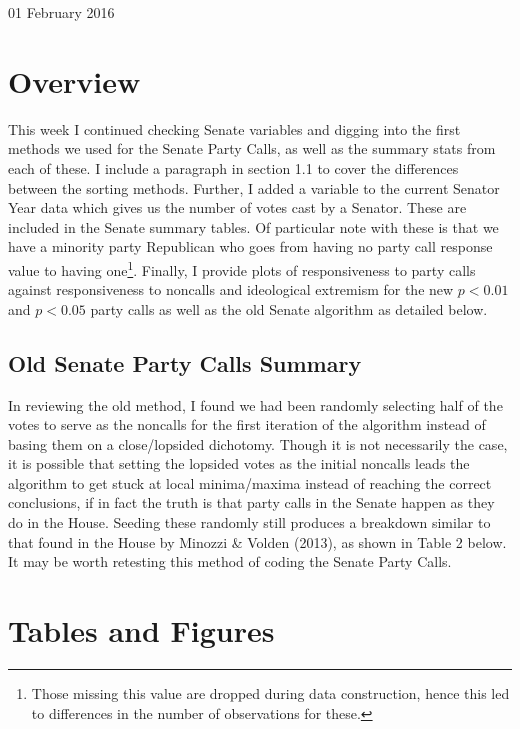 \documentclass[12pt]{article}
\begin{document}
\begin{center}
\Large 01 February 2016
\end{center}

\section{Overview}

This week I continued checking Senate variables and digging into the first methods we used for the Senate Party Calls, as well as the summary stats from each of these. I include a paragraph in section 1.1 to cover the differences between the sorting methods. Further, I added a variable to the current Senator Year data which gives us the number of votes cast by a Senator. These are included in the Senate summary tables. Of particular note with these is that we have a minority party Republican who goes from having no party call response value to having one\footnote{Those missing this value are dropped during data construction, hence this led to differences in the number of observations for these.}. Finally, I provide plots of responsiveness to party calls against responsiveness to noncalls and ideological extremism for the new $ p < 0.01 $ and $ p < 0.05 $ party calls as well as the old Senate algorithm as detailed below.

\subsection{Old Senate Party Calls Summary}

In reviewing the old method, I found we had been randomly selecting half of the votes to serve as the noncalls for the first iteration of the algorithm instead of basing them on a close/lopsided dichotomy. Though it is not necessarily the case, it is possible that setting the lopsided votes as the initial noncalls leads the algorithm to get stuck at local minima/maxima instead of reaching the correct conclusions, if in fact the truth is that party calls in the Senate happen as they do in the House. Seeding these randomly still produces a breakdown similar to that found in the House by Minozzi \& Volden (2013), as shown in Table 2 below. It may be worth retesting this method of coding the Senate Party Calls.


\section{Tables and Figures}
\end{document}
